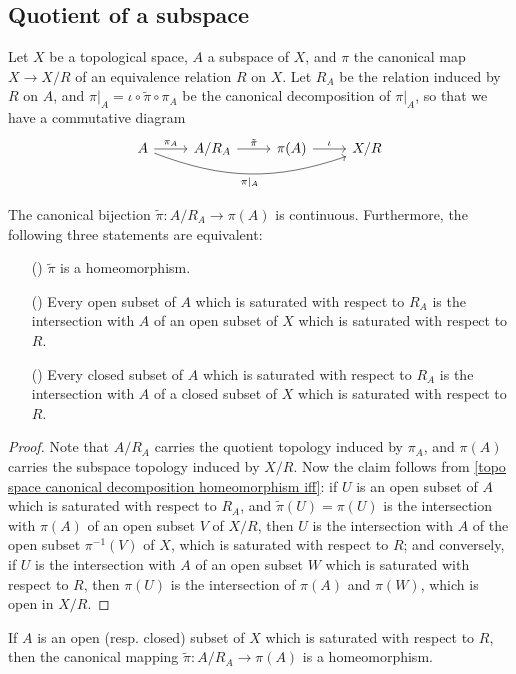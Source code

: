\subsection{Quotient of a subspace}
Let $X$ be a topological space, $A$ a subspace of $X$, and $\pi$ the canonical map $X\to X/R$ of an equivalence relation $R$ on $X$. Let $R_A$ be the relation induced by $R$ on $A$, and $\pi|_A=\iota\circ\tilde{\pi}\circ\pi_A$ be the canonical decomposition of $\pi|_A$, so that we have a commutative diagram
\[\begin{tikzcd}
A\ar[rrr,bend right=20pt,swap,"\pi|_A"]\ar[r,"\pi_A"]&A/R_A\ar[r,"\tilde{\pi}"]&\pi(A)\ar[r,"\iota"]&X/R
\end{tikzcd}\]
\begin{proposition}\label{topo space quotient topology on subspace iff}
The canonical bijection $\tilde{\pi}:A/R_A\to\pi(A)$ is continuous. Furthermore, the following three statements are equivalent:
\begin{itemize}
\item[(\rmnum{1})] $\tilde{\pi}$ is a homeomorphism.
\item[(\rmnum{2})] Every open subset of $A$ which is saturated with respect to $R_A$ is the intersection with $A$ of an open subset of $X$ which is saturated with respect to $R$.
\item[(\rmnum{3})] Every closed subset of $A$ which is saturated with respect to $R_A$ is the intersection with $A$ of a closed subset of $X$ which is saturated with respect to $R$. 
\end{itemize}
\end{proposition}
\begin{proof}
Note that $A/R_A$ carries the quotient topology induced by $\pi_A$, and $\pi(A)$ carries the subspace topology induced by $X/R$. Now the claim follows from \cref{topo space canonical decomposition homeomorphism iff}: if $U$ is an open subset of $A$ which is saturated with respect to $R_A$, and $\tilde{\pi}(U)=\pi(U)$ is the intersection with $\pi(A)$ of an open subset $V$ of $X/R$, then $U$ is the intersection with $A$ of the open subset $\pi^{-1}(V)$ of $X$, which is saturated with respect to $R$; and conversely, if $U$ is the intersection with $A$ of an open subset $W$ which is saturated with respect to $R$, then $\pi(U)$ is the intersection of $\pi(A)$ and $\pi(W)$, which is open in $X/R$.
\end{proof}
\begin{corollary}\label{topo space quotient map on saturated open set is quotient map}
If $A$ is an open (resp. closed) subset of $X$ which is saturated with respect to $R$, then the canonical mapping $\tilde{\pi}:A/R_A\to\pi(A)$ is a homeomorphism.
\end{corollary}
